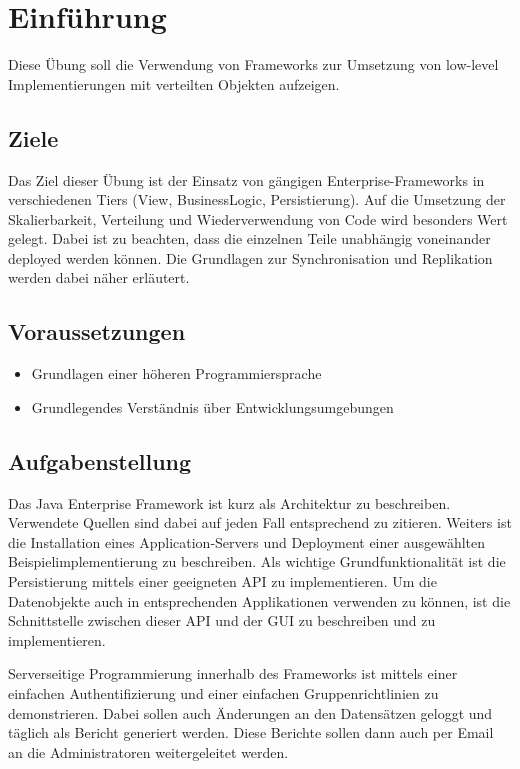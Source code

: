 
\section{Einführung}

Diese Übung soll die Verwendung von Frameworks zur Umsetzung von low-level Implementierungen mit verteilten Objekten aufzeigen.

\subsection{Ziele}

Das Ziel dieser Übung ist der Einsatz von gängigen Enterprise-Frameworks in verschiedenen Tiers (View, BusinessLogic, Persistierung). Auf die Umsetzung der Skalierbarkeit, Verteilung und Wiederverwendung von Code wird besonders Wert gelegt. Dabei ist zu beachten, dass die einzelnen Teile unabhängig voneinander deployed werden können. Die Grundlagen zur Synchronisation und Replikation werden dabei näher erläutert.

\subsection{Voraussetzungen}

\begin{itemize}
    \item Grundlagen einer höheren Programmiersprache
    \item Grundlegendes Verständnis über Entwicklungsumgebungen
\end{itemize}

\subsection{Aufgabenstellung}

Das Java Enterprise Framework ist kurz als Architektur zu beschreiben. Verwendete Quellen sind dabei auf jeden Fall entsprechend zu zitieren. Weiters ist die Installation eines Application-Servers und Deployment einer ausgewählten Beispielimplementierung zu beschreiben. Als wichtige Grundfunktionalität ist die Persistierung mittels einer geeigneten API zu implementieren. Um die Datenobjekte auch in entsprechenden Applikationen verwenden zu können, ist die Schnittstelle zwischen dieser API und der GUI zu beschreiben und zu implementieren.

Serverseitige Programmierung innerhalb des Frameworks ist mittels einer einfachen Authentifizierung und einer einfachen Gruppenrichtlinien zu demonstrieren. Dabei sollen auch Änderungen an den Datensätzen geloggt und täglich als Bericht generiert werden. Diese Berichte sollen dann auch per Email an die Administratoren weitergeleitet werden.

